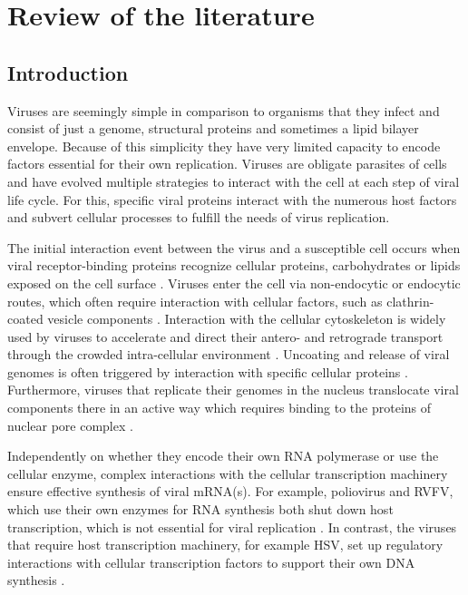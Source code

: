 \newpage
\setcounter{page}{1}
\doublespacing
\section{Review of the literature}

\subsection{Introduction}
	
	Viruses are seemingly simple in comparison to organisms that they infect and consist of just a genome, structural proteins and sometimes a lipid bilayer envelope. Because of this simplicity they have very limited capacity to encode factors essential for their own replication. Viruses are obligate parasites of cells and have evolved multiple strategies to interact with the cell at each step of viral life cycle. For this, specific viral proteins interact with the numerous host factors and subvert cellular processes to fulfill the needs of virus replication. 
			
	The initial interaction event between the virus and a susceptible cell occurs when viral receptor-binding proteins recognize cellular proteins, carbohydrates or lipids exposed on the cell surface \parencite{Grove2011}. Viruses enter the cell via non-endocytic or endocytic routes, which often require interaction with cellular factors, such as clathrin-coated vesicle components \parencite{Dimitrov2004, Yamauchi2013}. Interaction with the cellular cytoskeleton is widely used by viruses to accelerate and direct their antero- and retrograde transport through the crowded intra-cellular environment \parencite{Ploubidou2001}. Uncoating and release of viral genomes is often triggered by interaction with specific cellular proteins \parencite{Suomalainen2013, Haywood2010}. Furthermore, viruses that replicate their genomes in the nucleus translocate viral components there in an active way which requires binding to the proteins of nuclear pore complex \parencite{Kobiler2012}.
				
	Independently on whether they encode their own RNA polymerase or use the cellular enzyme, complex interactions with the cellular transcription machinery ensure effective synthesis of viral mRNA(s). For example, poliovirus and \gls{RVFV}, which use their own enzymes for RNA synthesis both shut down host transcription, which is not essential for viral replication \parencite{Kundu2005, LeMay2004}. In contrast, the viruses that require host transcription machinery, for example \gls{HSV}, set up regulatory interactions with cellular transcription factors to support their own DNA synthesis \parencite{Wysocka2003}.

